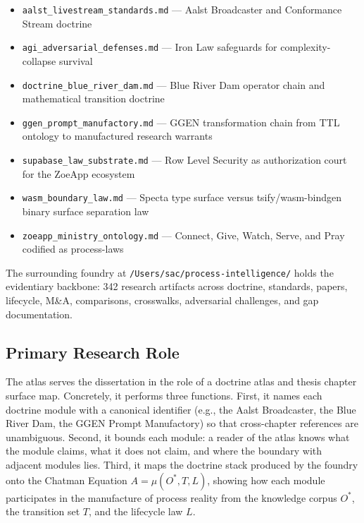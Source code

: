 \begin{itemize}
  \item \texttt{aalst\_livestream\_standards.md} --- Aalst Broadcaster and
        Conformance Stream doctrine
  \item \texttt{agi\_adversarial\_defenses.md} --- Iron Law safeguards for
        complexity-collapse survival
  \item \texttt{doctrine\_blue\_river\_dam.md} --- Blue River Dam operator
        chain and mathematical transition doctrine
  \item \texttt{ggen\_prompt\_manufactory.md} --- GGEN transformation chain
        from TTL ontology to manufactured research warrants
  \item \texttt{supabase\_law\_substrate.md} --- Row Level Security as
        authorization court for the ZoeApp ecosystem
  \item \texttt{wasm\_boundary\_law.md} --- Specta type surface versus
        tsify/wasm-bindgen binary surface separation law
  \item \texttt{zoeapp\_ministry\_ontology.md} --- Connect, Give, Watch, Serve,
        and Pray codified as process-laws
\end{itemize}

The surrounding foundry at \texttt{/Users/sac/process-intelligence/} holds the
evidentiary backbone: 342 research artifacts across doctrine, standards, papers,
lifecycle, M\&A, comparisons, crosswalks, adversarial challenges, and gap
documentation.

\subsection{Primary Research Role}
\label{sec:atlas-identity-role}

The atlas serves the dissertation in the role of a doctrine atlas and thesis
chapter surface map. Concretely, it performs three functions. First, it names
each doctrine module with a canonical identifier (e.g., the Aalst Broadcaster,
the Blue River Dam, the GGEN Prompt Manufactory) so that cross-chapter
references are unambiguous. Second, it bounds each module: a reader of the
atlas knows what the module claims, what it does not claim, and where the
boundary with adjacent modules lies. Third, it maps the doctrine stack produced
by the foundry onto the Chatman Equation $A = \mu(O^*, T, L)$, showing how each
module participates in the manufacture of process reality from the knowledge
corpus $O^*$, the transition set $T$, and the lifecycle law $L$.

